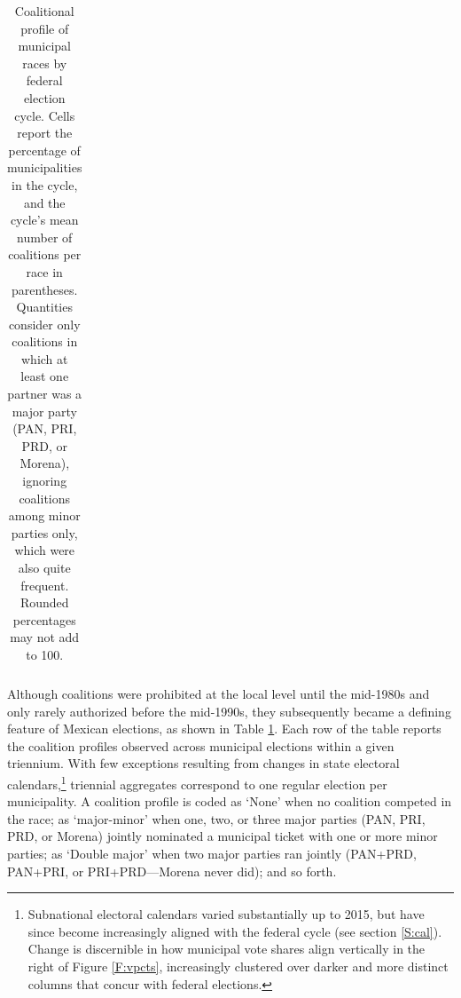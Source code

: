 \documentclass[letter,12pt]{article}
\begin{document}
\begin{table}
{\begin{tabular}{crrrrrrrrrrrrc}
         &     &     &     &           &&      &          &        &&       &               &     &        \\ [-1.8ex] 
  \hline
  \end{tabular}
}
\caption{Coalitional profile of municipal races by federal election cycle. Cells report the percentage of municipalities in the cycle, and the cycle's mean number of coalitions per race in parentheses. Quantities consider only coalitions in which at least one partner was a major party (PAN, PRI, PRD, or Morena), ignoring coalitions among minor parties only, which were also quite frequent. Rounded percentages may not add to 100.}\label{T:coal}
\end{table}

Although coalitions were prohibited at the local level until the mid-1980s and only rarely authorized before the mid-1990s, they subsequently became a defining feature of Mexican elections, as shown in Table \ref{T:coal}. Each row of the table reports the coalition profiles observed across municipal elections within a given triennium. With few exceptions resulting from changes in state electoral calendars,\footnote{Subnational electoral calendars varied substantially up to 2015, but have since become increasingly aligned with the federal cycle (see section \ref{S:cal}). Change is discernible in how municipal vote shares align vertically in the right of Figure \ref{F:vpcts}, increasingly clustered over darker and more distinct columns that concur with federal elections.} triennial aggregates correspond to one regular election per municipality. A coalition profile is coded as `None' when no coalition competed in the race; as `major-minor' when one, two, or three major parties (PAN, PRI, PRD, or Morena) jointly nominated a municipal ticket with one or more minor parties; as `Double major' when two major parties ran jointly (PAN+PRD, PAN+PRI, or PRI+PRD---Morena never did); and so forth.
\end{document}
